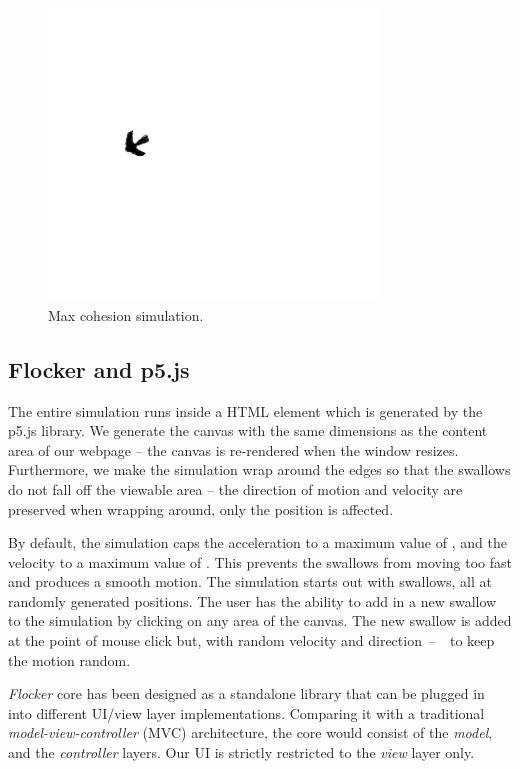 \documentclass[../main]{subfiles}
\begin{document}
\begin{figure}
    \centering
	\includegraphics[scale=0.30, width=250pt]{resources/flocker_max_cohesion.png}
	\caption{Max cohesion simulation.}
	\label{maxCohesionImg}
\end{figure}

\subsection{Flocker and p5.js}
\label{flocker_p5js}

The entire simulation runs inside a HTML  element which is generated by the p5.js library. We generate the canvas with the same dimensions as the content area of our webpage -- the canvas is re-rendered when the window resizes. Furthermore, we make the simulation wrap around the edges so that the swallows do not fall off the viewable area -- the direction of motion and velocity are preserved when wrapping around, only the position is affected.

By default, the simulation caps the acceleration to a maximum value of , and the velocity to a maximum value of . This prevents the swallows from moving too fast and produces a smooth motion. The simulation starts out with  swallows, all at randomly generated positions. The user has the ability to add in a new swallow to the simulation by clicking on any area of the canvas. The new swallow is added at the point of mouse click but, with random velocity and direction~--~~to keep the motion random.

{\em Flocker} core has been designed as a standalone \mbox{library} that can be plugged in into different UI/view layer \mbox{implementations}. Comparing it with a traditional \mbox{\em model-view-controller} (MVC) architecture, the core would consist of the {\em model}, and the {\em controller} layers. Our UI is strictly restricted to the {\em view} layer only.
\end{document}
